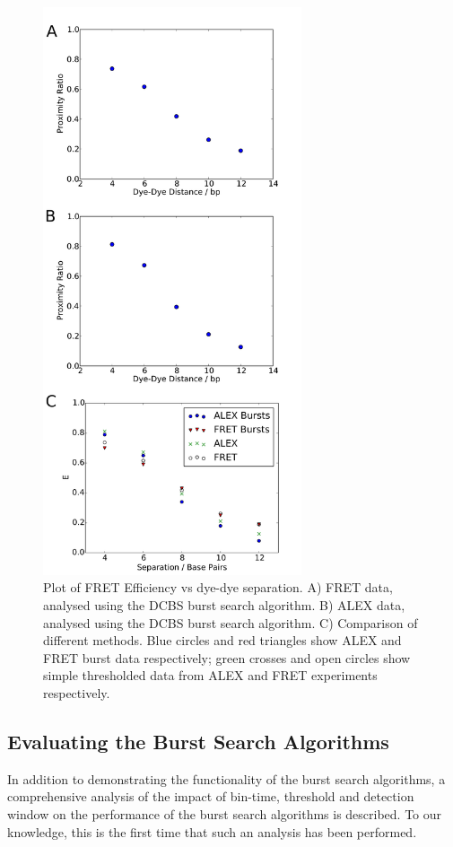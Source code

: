 \begin{figure}[!ht]
   \begin{center}
      \includegraphics*[clip=true, width=3in]{pyFRET/Bp_vs_E.pdf}
      \caption{Plot of FRET Efficiency vs dye-dye separation. A) FRET data, analysed using the DCBS burst search algorithm. B) ALEX data, analysed using the DCBS burst search algorithm. C) Comparison of different methods. Blue circles and red triangles show ALEX and FRET burst data respectively; green crosses and open circles show simple thresholded data from ALEX and FRET experiments respectively.}
      \label{fig:fig6_Eplots}
   \end{center}
\end{figure}

\subsection{Evaluating the Burst Search Algorithms}
In addition to demonstrating the functionality of the burst search algorithms, a comprehensive analysis of the impact of bin-time, threshold and detection window on the performance of the burst search algorithms is described. To our knowledge, this is the first time that such an analysis has been performed.


